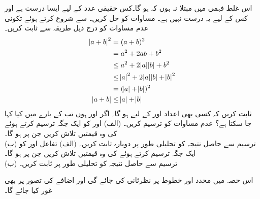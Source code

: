 اس غلط فہمی میں مبتلا نہ ہوں کہ  ہو گا۔کس حقیقی عدد  کے لیے ایسا درست ہے اور کس کے لیے یہ درست نہیں ہے۔
مساوات  کو حل کریں۔
  سے شروع کرتے ہوئے تکونی عدم مساوات کو درج ذیل طریقہ سے ثابت کریں۔
\begin{align*}
\abs{a+b}^2&=(a+b)^2\\
&=a^2+2ab+b^2\\
&\le a^2+2\abs{a}\abs{b}+b^2\\
&\le \abs{a}^2+2\abs{a}\abs{b}+\abs{b}^2\\
&=(\abs{a}+\abs{b})^2\\
\abs{a+b}&\le \abs{a}+\abs{b}
\end{align*}
ثابت کریں کہ کسی بھی اعداد  اور  کے لیے   ہو گا۔
اگر  اور  ہوں تب  کے بارے میں کیا کہا جا سکتا ہے؟
عدم مساوات  کو ترسیم کریں۔
(الف) \quad {} اور  کو ایک جگہ ترسیم کرتے ہوئے  کی وہ قیمتیں تلاش کریں جن پر  ہو گا۔\\
(ب) \quad
ترسیم سے حاصل نتیجہ کو تحلیلی طور پر دوبارہ ثابت کریں۔ 
(الف) \quad
تفاعل  اور  کو ایک جگہ ترسیم کرتے ہوئے  کی وہ قیمتیں تلاش کریں جن پر  ہو گا۔\\
(ب)\quad
ترسیم سے حاصل نتیجہ کو تحلیلی طور پر ثابت کریں۔


اس حصہ میں محدد اور خطوط پر نظرثانی کی جائے گی اور اضافے کی تصور پر بھی غور کیا جائے گا۔

